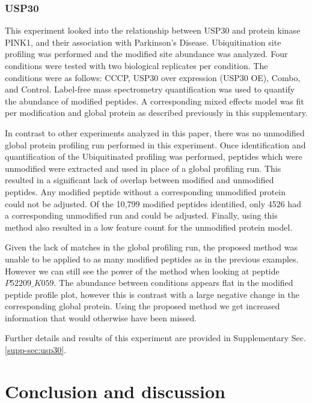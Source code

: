 \documentclass[mcp]{article}
\numberwithin{figure}{section} %
\numberwithin{table}{section}
\begin{document}
\subsubsection*{USP30}

This experiment looked into the relationship between USP30 and protein kinase PINK1, and their association with Parkinson’s Disease. Ubiquitination site profiling was performed and the modified site abundance was analyzed. Four conditions were tested with two biological replicates per condition. The conditions were as follows: CCCP, USP30 over expression (USP30 OE), Combo, and Control. Label-free mass spectrometry quantification was used to quantify the abundance of modified peptides. A corresponding mixed effects model was fit per modification and global protein as described previously in this supplementary. 

In contrast to other experiments analyzed in this paper, there was no unmodified global protein profiling run performed in this experiment. Once identification and quantification of the Ubiquitinated profiling was performed, peptides which were unmodified were extracted and used in place of a global profiling run. This resulted in a significant lack of overlap between modified and unmodified peptides. Any modified peptide without a corresponding unmodified protein could not be adjusted. Of the 10,799 modified peptides identified, only 4526 had a corresponding unmodified run and could be adjusted. Finally, using this method also resulted in a low feature count for the unmodified protein model.

Given the lack of matches in the global profiling run, the proposed method was unable to be applied to as many modified peptides as in the previous examples. However we can still see the power of the method when looking at peptide $P52209\_K059$. The abundance between conditions appears flat in the modified peptide profile plot, however this is contrast with a large negative change in the corresponding global protein. Using the proposed method we get increased information that would otherwise have been missed.

Further details and results of this experiment are provided in Supplementary Sec. \ref{supp-sec:usp30}. 

\section{Conclusion and discussion}
\end{document}
